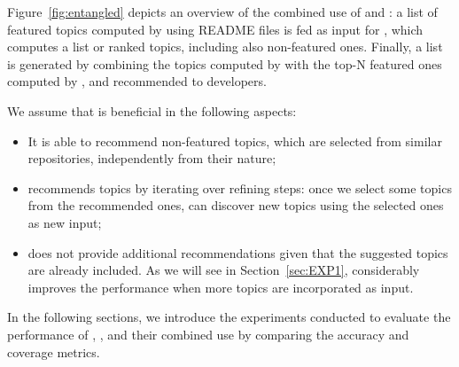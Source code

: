 Figure~\ref{fig:entangled} depicts an overview of the combined use of \MNB and 
\TFb: a 
list of featured topics computed by \MNB using README files is fed as input for 
\TFa, which computes a list or ranked topics, including also non-featured ones. 
Finally, a list is generated by combining the topics computed by \TF with the 
top-N featured ones computed by \MNB, and recommended to developers.






We assume that \TFb is beneficial in the following aspects:
\begin{itemize}
	\item It is able to recommend non-featured topics, which are selected from similar repositories, independently from their nature;
	\item \TFb recommends topics by iterating over refining steps: once we select some topics from the recommended ones, \TFb can discover new topics using the selected ones as new input;
	\item \MNB does not provide additional recommendations given that the suggested topics are already included. As we will see in Section~\ref{sec:EXP1}, \TFb considerably improves the performance when more topics are incorporated as input.
\end{itemize}

In the following sections, we introduce the experiments conducted to evaluate 
the performance of \TFa, \MNB, and their combined use by comparing the 
accuracy and coverage metrics.

